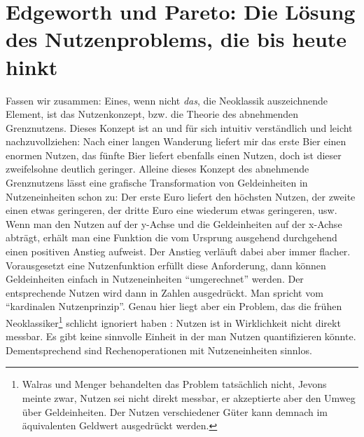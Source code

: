 \section{Edgeworth und Pareto: Die Lösung des Nutzenproblems, die bis heute hinkt}
\label{Pareto}

Fassen wir zusammen: Eines, wenn nicht \textit{das}, die Neoklassik auszeichnende Element, ist das Nutzenkonzept, bzw. die Theorie des abnehmenden Grenznutzens. Dieses Konzept ist an und für sich intuitiv verständlich und leicht nachzuvollziehen: Nach einer langen Wanderung liefert mir das erste Bier einen enormen Nutzen, das fünfte Bier liefert ebenfalls einen Nutzen, doch ist dieser zweifelsohne deutlich geringer. Alleine dieses Konzept des abnehmende Grenznutzens lässt eine grafische Transformation von Geldeinheiten in Nutzeneinheiten schon zu: Der erste Euro liefert den höchsten Nutzen, der zweite einen etwas geringeren, der dritte Euro eine wiederum etwas geringeren, usw. Wenn man den Nutzen auf der y-Achse und die Geldeinheiten auf der x-Achse abträgt, erhält man eine Funktion die vom Ursprung ausgehend durchgehend einen positiven Anstieg aufweist. Der Anstieg verläuft dabei aber immer flacher. Vorausgesetzt eine Nutzenfunktion erfüllt diese Anforderung, dann können Geldeinheiten einfach in Nutzeneinheiten "`umgerechnet"' werden. Der entsprechende Nutzen wird dann in Zahlen ausgedrückt. Man spricht vom "`kardinalen Nutzenprinzip"'. Genau hier liegt aber ein Problem, das die frühen Neoklassiker\footnote{Walras und Menger behandelten das Problem tatsächlich nicht, Jevons meinte zwar, Nutzen sei nicht direkt messbar, er akzeptierte aber den Umweg über Geldeinheiten. Der Nutzen verschiedener Güter kann demnach im äquivalenten Geldwert ausgedrückt werden.} schlicht ignoriert haben \parencite[S. 328]{Blaug1962}: Nutzen ist in Wirklichkeit nicht direkt messbar. Es gibt keine sinnvolle Einheit in der man Nutzen quantifizieren könnte. Dementsprechend sind Rechenoperationen mit Nutzeneinheiten sinnlos.

